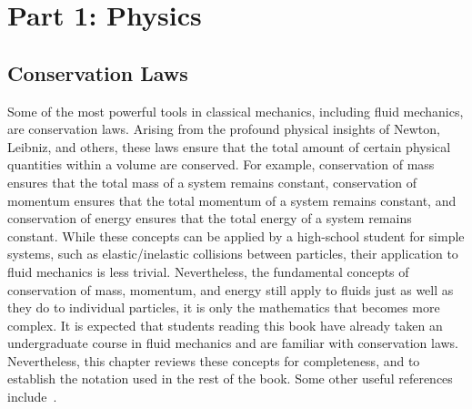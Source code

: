 \part{Part 1: Physics}


\chapter{Conservation Laws}
Some of the most powerful tools in classical mechanics, including fluid mechanics, are conservation laws. Arising from the profound physical insights of Newton, Leibniz, and others, these laws ensure that the total amount of certain physical quantities within a volume are conserved. For example, conservation of mass ensures that the total mass of a system remains constant, conservation of momentum ensures that the total momentum of a system remains constant, and conservation of energy ensures that the total energy of a system remains constant. While these concepts can be applied by a high-school student for simple systems, such as elastic/inelastic collisions between particles, their application to fluid mechanics is less trivial. Nevertheless, the fundamental concepts of conservation of mass, momentum, and energy still apply to fluids just as well as they do to individual particles, it is only the mathematics that becomes more complex. It is expected that students reading this book have already taken an undergraduate course in fluid mechanics and are familiar with conservation laws. Nevertheless, this chapter reviews these concepts for completeness, and to establish the notation used in the rest of the book. Some other useful references include~\cite{whiteFluidMechanics2015, hirschNumericalComputationInternal2007a, munsonFluidMechanics2013a}.

